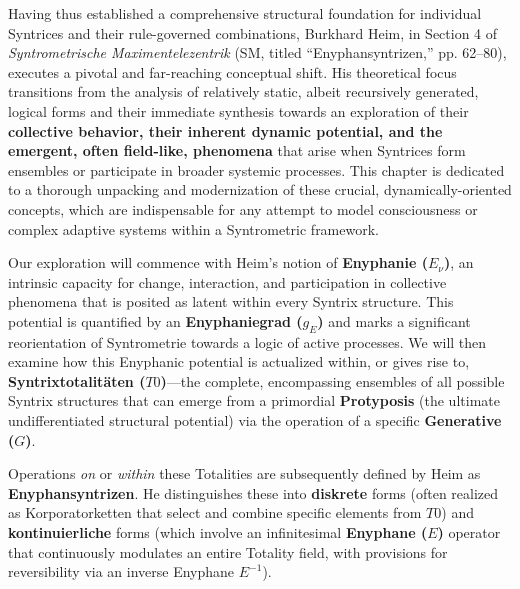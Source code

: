 \documentclass[
    12pt,              %
    a4paper,           %
    headings=normal,   %
    twoside=true,      %
    BCOR=8mm,          %
]{scrbook}
\newcommand{\q}[1]{\enquote{#1}}
\newcommand{\enyphaniegrad}{g_E}
\newcommand{\syntrixtotalitaet}{T0}
\newcommand{\generative}{G}
\newcommand{\enyphane}{E}
\begin{document}
Having thus established a comprehensive structural foundation for individual Syntrices and their rule-governed combinations, Burkhard Heim, in Section 4 of \textit{Syntrometrische Maximentelezentrik} (SM, titled \q{Enyphansyntrizen,} pp. 62–80), executes a pivotal and far-reaching conceptual shift. His theoretical focus transitions from the analysis of relatively static, albeit recursively generated, logical forms and their immediate synthesis towards an exploration of their \textbf{collective behavior, their inherent dynamic potential, and the emergent, often field-like, phenomena} that arise when Syntrices form ensembles or participate in broader systemic processes. This chapter is dedicated to a thorough unpacking and modernization of these crucial, dynamically-oriented concepts, which are indispensable for any attempt to model consciousness or complex adaptive systems within a Syntrometric framework.

Our exploration will commence with Heim's notion of \textbf{Enyphanie (\(E_\nu\))}, an intrinsic capacity for change, interaction, and participation in collective phenomena that is posited as latent within every Syntrix structure. This potential is quantified by an \textbf{Enyphaniegrad (\(\enyphaniegrad\))} and marks a significant reorientation of Syntrometrie towards a logic of active processes. We will then examine how this Enyphanic potential is actualized within, or gives rise to, \textbf{Syntrixtotalitäten (\(\syntrixtotalitaet\))}—the complete, encompassing ensembles of all possible Syntrix structures that can emerge from a primordial \textbf{Protyposis} (the ultimate undifferentiated structural potential) via the operation of a specific \textbf{Generative (\(\generative\))}.

Operations \textit{on} or \textit{within} these Totalities are subsequently defined by Heim as \textbf{Enyphansyntrizen}. He distinguishes these into \textbf{diskrete} forms (often realized as Korporatorketten that select and combine specific elements from \(\syntrixtotalitaet\)) and \textbf{kontinuierliche} forms (which involve an infinitesimal \textbf{Enyphane (\(\enyphane\))} operator that continuously modulates an entire Totality field, with provisions for reversibility via an inverse Enyphane \(\enyphane^{-1}\)).
\end{document}
